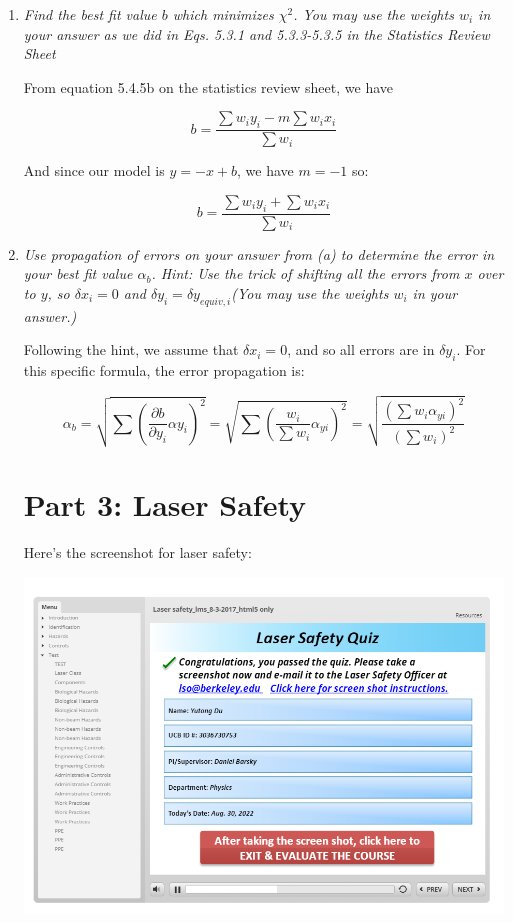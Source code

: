 \documentclass{article}
\theoremstyle{definition}
\numberwithin{equation}{section}
\numberwithin{definition}{section}
\begin{document}
\begin{enumerate}
    \item \textit{Find the best fit value $b$ which minimizes $\chi^2$. You may use the weights $w_i$ in your answer as we did in Eqs. 5.3.1 and 5.3.3-5.3.5 in the Statistics Review Sheet}
    

    From equation 5.4.5b on the statistics review sheet, we have 

    \[ b = \frac{\sum w_i y_i - m \sum w_i x_i}{\sum w_i}\]

    And since our model is $y = -x + b$, we have $m = -1$ so:

    \[ b = \frac{\sum w_i y_i + \sum w_ix_i}{\sum w_i}\]


    \item \textit{Use propagation of errors on your answer from (a) to determine the error in your best fit value $\alpha_b$. Hint: Use the trick of shifting all the errors from $x$ over to $y$, so $\delta x_i = 0$ and $\delta y_i = \delta y_{equiv, i}$(You may use the weights $w_i$ in your answer.)}
    
    Following the hint, we assume that $\delta x_i = 0$, and so all errors are in $\delta y_i$. For this specific formula, the error propagation is: 
    
    \[ \alpha_b = \sqrt{\sum \left(\frac{\partial b}{\partial y_i} \alpha y_i\right)^2} = \sqrt{\sum \left(\frac{w_i}{\sum w_i} \alpha_{yi}\right)^2} = \sqrt{\frac{(\sum w_i \alpha_{yi})^2}{(\sum w_i)^2}}\]

\pagebreak

\section*{Part 3: Laser Safety}

Here's the screenshot for laser safety:

\begin{center}
    \includegraphics[scale=0.5]{laser safety.png}
\end{center}

\end{enumerate}
\end{document}
